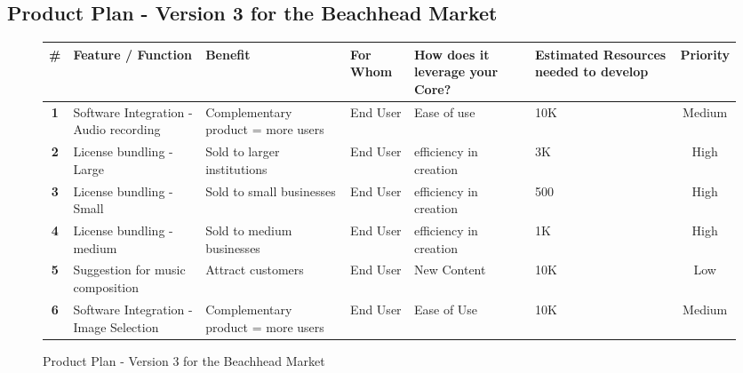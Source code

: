 \documentclass{article}
\begin{document}
    \subsection{Product Plan - Version 3 for the Beachhead Market}
        \begin{figure}[h!]
            \begin{center}
                \begin{tabular}{ | c | p{1.75cm} | p{2.5cm} | p{1.25cm} | p{2cm} | p{2cm} | c |}
                    \hline
                    \raggedright \textbf{\#} &
                        \raggedright \textbf{Feature / Function} &
                        \raggedright \textbf{Benefit} &
                        \raggedright \textbf{For Whom} &
                        \raggedright \textbf{How does it leverage your Core?} &
                        \raggedright \textbf{Estimated Resources needed to develop} &
                        \textbf{Priority}
                    \\ \hline
                    \textbf{1} & \raggedright Software Integration - Audio recording & \raggedright Complementary product = more users & \raggedright End User & \raggedright Ease of use & 10K & Medium
                    \\ \hline
                    \textbf{2} & \raggedright License bundling - Large & \raggedright Sold to larger institutions & \raggedright End User & \raggedright efficiency in creation & 3K & High
                    \\ \hline
                    \textbf{3} & \raggedright License bundling - Small & \raggedright Sold to small businesses & \raggedright End User & \raggedright efficiency in creation & 500 & High
                    \\ \hline
                    \textbf{4} & \raggedright License bundling - medium & \raggedright Sold to medium businesses & \raggedright End User & \raggedright efficiency in creation & 1K & High
                    \\ \hline
                    \textbf{5} & \raggedright Suggestion for music composition & \raggedright Attract customers & \raggedright End User & \raggedright New Content & 10K & Low
                    \\ \hline
                    \textbf{6} & \raggedright Software Integration - Image Selection & \raggedright Complementary product = more users & \raggedright End User & \raggedright Ease of Use & 10K & Medium
                    \\ \hline
                \end{tabular}
                \caption{Product Plan - Version 3 for the Beachhead Market}
            \end{center} 
        \end{figure}
\end{document}
